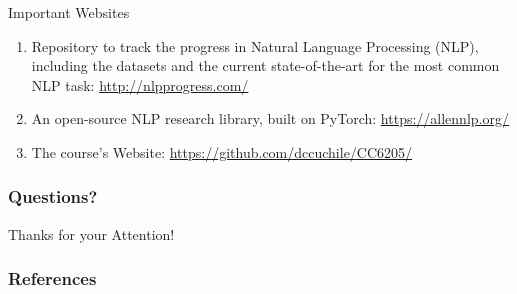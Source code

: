 \documentclass[handout]{beamer}
\begin{document}
\begin{frame}{Important Websites}

\begin{scriptsize}
\begin{enumerate}
\item Repository to track the progress in Natural Language Processing (NLP), including the datasets and the current state-of-the-art for the most common NLP task: \url{http://nlpprogress.com/}
\item An open-source NLP research library, built on PyTorch: \url{https://allennlp.org/}
\item The course's Website: \url{https://github.com/dccuchile/CC6205/}
\end{enumerate} 
\end{scriptsize}
\end{frame}




\begin{frame}
\frametitle{Questions?}
\begin{center}\LARGE Thanks for your Attention!\\ \end{center}



\end{frame}

\begin{frame}[allowframebreaks]\scriptsize
\frametitle{References}


%
\end{frame}  


\end{document}
